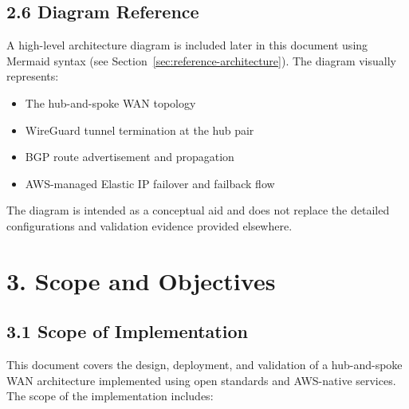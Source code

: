 \documentclass[11pt]{article}
\begin{document}
\subsection{2.6 Diagram Reference}
\label{sec:exec-diagram-reference}

A high-level architecture diagram is included later in this document using Mermaid syntax (see Section~\ref{sec:reference-architecture}). The diagram visually represents:

\begin{itemize}
  \item The hub-and-spoke WAN topology
  \item WireGuard tunnel termination at the hub pair
  \item BGP route advertisement and propagation
  \item AWS-managed Elastic IP failover and failback flow
\end{itemize}

The diagram is intended as a conceptual aid and does not replace the detailed configurations and validation evidence provided elsewhere.

%
%
%
\section{3. Scope and Objectives}
\label{sec:scope-objectives}

\subsection{3.1 Scope of Implementation}
\label{sec:scope-implementation}

This document covers the design, deployment, and validation of a hub-and-spoke WAN architecture implemented using open standards and AWS-native services. The scope of the implementation includes:
\end{document}
